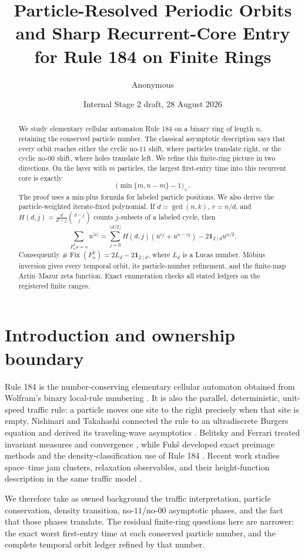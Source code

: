 \documentclass[11pt,a4paper]{amsart}
\title[Periodic orbits of Rule 184]{Particle-Resolved Periodic Orbits and Sharp Recurrent-Core Entry for Rule 184 on Finite Rings}
\author{Anonymous}
\date{Internal Stage 2 draft, 28 August 2026}
\theoremstyle{definition}
\theoremstyle{remark}
\newcommand{\Fix}{\operatorname{Fix}}
\newcommand{\1}{\mathbf 1}
\begin{document}
\begin{abstract}
We study elementary cellular automaton Rule 184 on a binary ring of length
$n$, retaining the conserved particle number.  The classical asymptotic
description says that every orbit reaches either the cyclic no-$11$ shift,
where particles translate right, or the cyclic no-$00$ shift, where holes
translate left.  We refine this finite-ring picture in two directions.  On
the layer with $m$ particles, the largest first-entry time into this recurrent
core is exactly
\[
 \bigl(\min\{m,n-m\}-1\bigr)_+.
\]
The proof uses a min-plus formula for labeled particle positions.  We also
derive the particle-weighted iterate-fixed polynomial.  If
$d=\gcd(n,k)$, $r=n/d$, and
$H(d,j)=\frac d{d-j}\binom{d-j}{j}$ counts $j$-subsets of a labeled cycle,
then
\[
 \sum_{F_n^kx=x}u^{|x|}
 =\sum_{j=0}^{\lfloor d/2\rfloor}H(d,j)
   (u^{rj}+u^{n-rj})-2\1_{2\mid d}u^{n/2}.
\]
Consequently $\#\Fix(F_n^k)=2L_d-2\1_{2\mid d}$, where $L_d$ is a Lucas
number.  M\"obius inversion gives every temporal orbit, its particle-number
refinement, and the finite-map Artin--Mazur zeta function.  Exact enumeration
checks all stated ledgers on the registered finite ranges.
\end{abstract}

\maketitle

\section{Introduction and ownership boundary}

Rule 184 is the number-conserving elementary cellular automaton obtained from
Wolfram's binary local-rule numbering \cite{Wolfram1983}.  It is also the
parallel, deterministic, unit-speed traffic rule: a particle moves one site
to the right precisely when that site is empty.  Nishinari and Takahashi
connected the rule to an ultradiscrete Burgers equation and derived its
traveling-wave asymptotics \cite{NishinariTakahashi1998}.  Belitsky and
Ferrari treated invariant measures and convergence \cite{BelitskyFerrari2005},
while Fuk\'s developed exact preimage methods and the density-classification
use of Rule 184 \cite{Fuks1997}.  Recent work studies space--time jam
clusters, relaxation observables, and their height-function description in
the same traffic model \cite{JhaEtAl2025,JhaEtAl2026}.

We therefore take as owned background the traffic interpretation, particle
conservation, density transition, no-$11$/no-$00$ asymptotic phases, and the
fact that those phases translate.  The residual finite-ring questions here
are narrower: the exact worst first-entry time at each conserved particle
number, and the complete temporal orbit ledger refined by that number.
\end{document}
